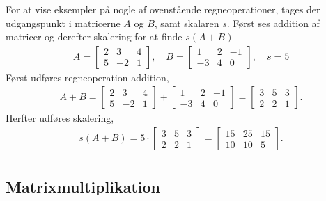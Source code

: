 \begin{eks}
For at vise eksempler på nogle af ovenstående regneoperationer, tages der udgangspunkt i matricerne $A$ og $B$, samt skalaren $s$. Først ses addition af matricer og derefter skalering for at finde $s(A+B)$
\begin{align*}
A= \begin{bmatrix}
	2 & 3 & 4 \\
	5 & -2 & 1 	
\end{bmatrix}, \quad
B= \begin{bmatrix}
	1 & 2 & -1 \\
	-3 & 4 & 0
\end{bmatrix}, \quad
s=5
\end{align*}
Først udføres regneoperation addition,
\begin{align*}
A+B= \begin{bmatrix}
	2 & 3 & 4 \\
	5 & -2 & 1 	
\end{bmatrix}  
+ \begin{bmatrix}
	1 & 2 & -1 \\
	-3 & 4 & 0
\end{bmatrix}
= \begin{bmatrix}
	3 & 5 & 3 \\
	2 & 2 & 1
\end{bmatrix}.
\end{align*}
Herfter udføres skalering,
\begin{align*}
s(A+B)= 5 \cdot \begin{bmatrix}
	3 & 5 & 3 \\
	2 & 2 & 1
\end{bmatrix}
= \begin{bmatrix}
	15 & 25 & 15 \\
	10 & 10 & 5
\end{bmatrix}.\\
\end{align*}
\end{eks}

\subsection{Matrixmultiplikation}


